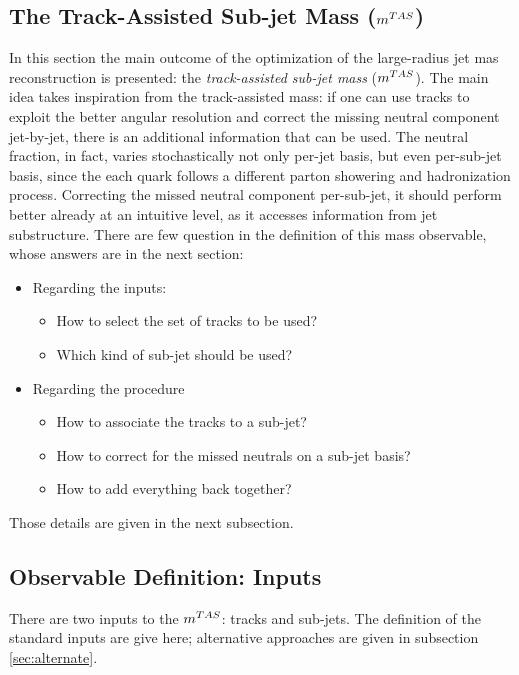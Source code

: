 \subsection{The Track-Assisted Sub-jet Mass ($m^{TAS}$)}
In this section the main outcome of the optimization of the large-radius jet mas reconstruction is presented: the \textit{track-assisted sub-jet mass} ($m^{TAS}$).
The main idea takes inspiration from the track-assisted mass: if one can use tracks to exploit the better angular resolution and correct the missing neutral component jet-by-jet, there is an additional information that can be used. The neutral fraction, in fact, varies stochastically not only per-jet basis, but even per-sub-jet basis, since the each quark follows a different parton showering and hadronization process.
Correcting the missed neutral component per-sub-jet, it should perform better already at an intuitive level, as it accesses information from jet substructure.
There are few question in the definition of this mass observable, whose answers are in the next section:
\begin{itemize}
  \item Regarding the inputs:
  \begin{itemize}
     \item How to select the set of tracks to be used?
     \item Which kind of sub-jet should be used?
  \end{itemize}
  \item Regarding the procedure
  \begin{itemize}
  
  \item How to associate the tracks to a sub-jet?
  \item How to correct for the missed neutrals on a sub-jet basis?
  \item How to add everything back together?
 \end{itemize} 
 
\end{itemize}

Those details are given in the next subsection.


\subsection{Observable Definition: Inputs}
There are two inputs to the $m^{TAS}$: tracks and sub-jets. The definition of the standard inputs are give here; alternative approaches are given in subsection \ref{sec:alternate}.

